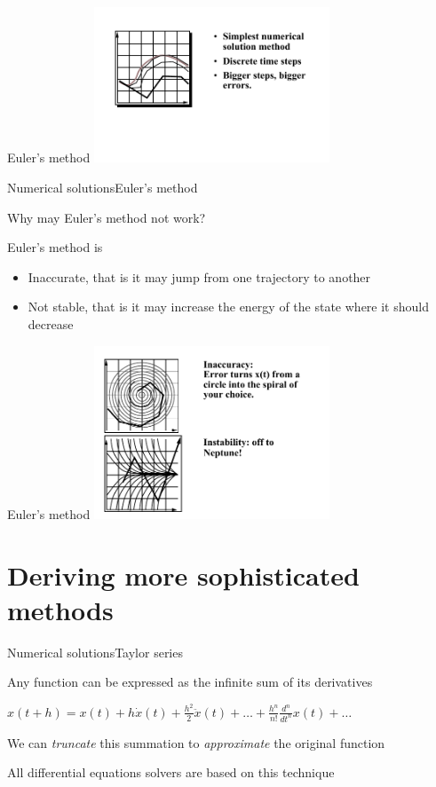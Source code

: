 \documentclass{beamer}
\begin{document}
\begin{frame}{Euler's method}
\center
\includegraphics[width=7cm]{Pics/Fig3.png}
\end{frame}

\begin{slide}{Numerical solutions}{Euler's method}{
\item Why may Euler's method not work?
\item Euler's method is
\begin{itemize}
\item Inaccurate, that is it may jump from one trajectory to another
\item Not stable, that is it may increase the energy of the state where it should decrease
\end{itemize}
}\end{slide}

\begin{frame}{Euler's method}
\center
\includegraphics[width=7cm]{Pics/Fig4.png}
\end{frame}

\section{Deriving more sophisticated methods}
\begin{slide}{Numerical solutions}{Taylor series}{
\item Any function can be expressed as the infinite sum of its derivatives
\item $x(t+h) = x(t) + h \dot x(t) + \frac{h^2}{2} \ddot x(t) + \dots + \frac{h^n}{n!} \frac{d^n}{dt^n}x(t) + \dots$
\pause
\item We can \textit{truncate} this summation to \textit{approximate} the original function
\item All differential equations solvers are based on this technique
}\end{slide}
\end{document}
